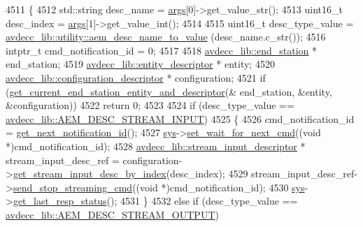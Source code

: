 \begin{DoxyCode}
4511 \{
4512     std::string desc\_name = \hyperlink{namespaceastime__fitline_a8187411843a6284ffb964ef3fb9fcab3}{args}[0]->get\_value\_str();
4513     uint16\_t desc\_index = \hyperlink{namespaceastime__fitline_a8187411843a6284ffb964ef3fb9fcab3}{args}[1]->get\_value\_int();
4514 
4515     uint16\_t desc\_type\_value = \hyperlink{namespaceavdecc__lib_1_1utility_a9f6076e32fa227555a95b6e95ea1e29b}{avdecc\_lib::utility::aem\_desc\_name\_to\_value}
      (desc\_name.c\_str());
4516     intptr\_t cmd\_notification\_id = 0;
4517 
4518     \hyperlink{classavdecc__lib_1_1end__station}{avdecc\_lib::end\_station} * end\_station;
4519     \hyperlink{classavdecc__lib_1_1entity__descriptor}{avdecc\_lib::entity\_descriptor} * entity;
4520     \hyperlink{classavdecc__lib_1_1configuration__descriptor}{avdecc\_lib::configuration\_descriptor} * configuration;
4521     \textcolor{keywordflow}{if} (\hyperlink{classcmd__line_ac2d4611fba7db03d436a2e3c1e64828e}{get\_current\_end\_station\_entity\_and\_descriptor}(&
      end\_station, &entity, &configuration))
4522         \textcolor{keywordflow}{return} 0;
4523 
4524     \textcolor{keywordflow}{if} (desc\_type\_value == \hyperlink{namespaceavdecc__lib_ac7b7d227e46bc72b63ee9e9aae15902fa00d002e47651a1b007d50f9f2da51e53}{avdecc\_lib::AEM\_DESC\_STREAM\_INPUT})
4525     \{
4526         cmd\_notification\_id = \hyperlink{classcmd__line_a57486218387d1aa9d262eb7c176154ad}{get\_next\_notification\_id}();
4527         \hyperlink{classcmd__line_a485db4800e331cb4052c447fdf5d154e}{sys}->\hyperlink{classavdecc__lib_1_1system_a26b769584f10225077da47583edda33e}{set\_wait\_for\_next\_cmd}((\textcolor{keywordtype}{void} *)cmd\_notification\_id);
4528         \hyperlink{classavdecc__lib_1_1stream__input__descriptor}{avdecc\_lib::stream\_input\_descriptor} * stream\_input\_desc\_ref = 
      configuration->\hyperlink{classavdecc__lib_1_1configuration__descriptor_a69cfe9032cea21937b4153878f8a925c}{get\_stream\_input\_desc\_by\_index}(desc\_index);
4529         stream\_input\_desc\_ref->\hyperlink{classavdecc__lib_1_1stream__input__descriptor_a3a5df38802b65e88b6adb330361e4fdf}{send\_stop\_streaming\_cmd}((\textcolor{keywordtype}{void} *)cmd\_notification\_id);
4530         \hyperlink{classcmd__line_a485db4800e331cb4052c447fdf5d154e}{sys}->\hyperlink{classavdecc__lib_1_1system_aa63e8d1a4e51f695cdcccc9340922407}{get\_last\_resp\_status}();
4531     \}
4532     \textcolor{keywordflow}{else} \textcolor{keywordflow}{if} (desc\_type\_value == \hyperlink{namespaceavdecc__lib_ac7b7d227e46bc72b63ee9e9aae15902fa3e5e9421e49598854000feaa2fe71464}{avdecc\_lib::AEM\_DESC\_STREAM\_OUTPUT})

\end{DoxyCode}

